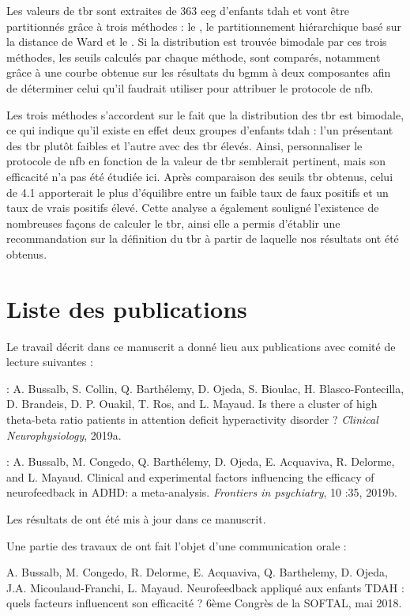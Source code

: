 Les valeurs de \gls{tbr} sont extraites de 363 \gls{eeg} d'enfants \gls{tdah} et vont être partitionnés grâce à trois méthodes : le , le partitionnement
hiérarchique basé sur la distance de Ward et le . Si la distribution est trouvée bimodale par ces trois méthodes, les seuils calculés par chaque méthode,
sont comparés, notamment grâce à une courbe  obtenue sur
les résultats du \gls{bgmm} à deux composantes afin de déterminer celui qu'il faudrait utiliser pour attribuer le protocole de \gls{nfb}.

Les trois méthodes s'accordent sur le fait que la distribution des \gls{tbr} est bimodale, ce qui indique qu'il existe en effet deux groupes d'enfants
\gls{tdah} : l'un présentant des \gls{tbr} plutôt faibles et l'autre avec des \gls{tbr} élevés. Ainsi, personnaliser le protocole de \gls{nfb} en 
fonction de la valeur de \gls{tbr} semblerait pertinent, mais son efficacité n'a pas été étudiée ici. Après comparaison des seuils \gls{tbr} obtenus, 
celui de 4.1 apporterait le plus d'équilibre entre 
un faible taux de faux positifs et un taux de vrais positifs élevé. Cette analyse a également souligné l'existence de nombreuses
façons de calculer le \gls{tbr}, ainsi elle a permis d'établir une recommandation sur la définition du \gls{tbr} à partir de laquelle nos
résultats ont été obtenus. 

\section{Liste des publications}

Le travail décrit dans ce manuscrit a donné lieu aux publications avec comité de lecture suivantes :

\begin{description}
\item \citet{Bussalb2019tbr} : A. Bussalb, S. Collin, Q. Barthélemy, D. Ojeda, S. Bioulac, H. Blasco-Fontecilla,
D. Brandeis, D. P. Ouakil, T. Ros, and L. Mayaud. Is there a cluster of high
theta-beta ratio patients in attention deficit hyperactivity disorder ? \textit{Clinical Neurophysiology}, 2019a.
\item \citet{Bussalb2019clinical} : A. Bussalb, M. Congedo, Q. Barthélemy, D. Ojeda, E. Acquaviva, R. Delorme,
and L. Mayaud. Clinical and experimental factors influencing the efficacy of
neurofeedback in ADHD: a meta-analysis. \textit{Frontiers in psychiatry}, 10 :35, 2019b.
\end{description}

Les résultats de \citet{Bussalb2019clinical} ont été mis à jour dans ce manuscrit.

Une partie des travaux de \citet{Bussalb2019clinical} ont fait l'objet d'une communication orale :
\begin{description}
\item A. Bussalb, M. Congedo, R. Delorme, E. Acquaviva, Q. Barthelemy, D. Ojeda, J.A. Micoulaud-Franchi, L. Mayaud. Neurofeedback 
appliqué aux enfants TDAH : quels facteurs influencent son efficacité ? 6ème Congrès de la SOFTAL, mai 2018. 
\end{description}
